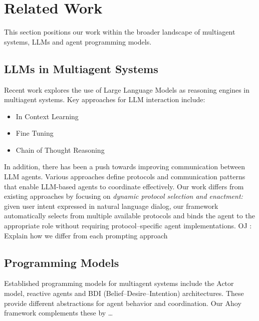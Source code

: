 \documentclass[runningheads]{llncs}
\newcounter{ojcount}
\newcommand{\oj}[1]{\stepcounter{ojcount}\textcolor{green!60!black}{\textsf{OJ \theojcount: #1}\newline}}
\newcommand{\ahoy}{Ahoy\xspace}
\begin{document}
\section{Related Work}
This section positions our work within the broader landscape of multiagent systems, LLMs and agent programming models.
\subsection{LLMs in Multiagent Systems}
Recent work explores the use of Large Language Models as reasoning engines in multiagent systems.
Key approaches for LLM interaction include:
\begin{itemize}
    \item In Context Learning
    \item Fine Tuning
    \item Chain of Thought Reasoning
\end{itemize}
In addition, there has been a push towards improving communication between LLM agents.
Various approaches define protocols and communication patterns that enable LLM-based agents to coordinate effectively.
Our work differs from existing approaches by focusing on \emph{dynamic protocol selection and enactment:} given user intent expressed in natural language dialog, our framework automatically selects from multiple available protocols and binds the agent to the appropriate role without requiring protocol--specific agent implementations.
\oj{Explain how we differ from each prompting approach}

\subsection{Programming Models}
Established programming models for multiagent systems include the Actor model, reactive agents and BDI (Belief--Desire--Intention) architectures.
These provide different abstractions for agent behavior and coordination.
Our \ahoy framework complements these by \ldots

\cite{singh2011information}


\end{document}
